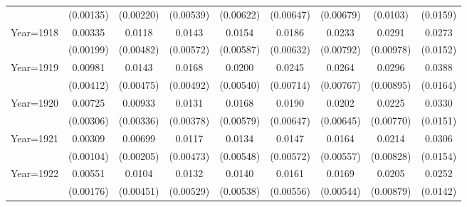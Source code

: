 \begin{table}[htbp]
\begin{tabular}{l*{8}{c}}
                    &   (0.00135)         &   (0.00220)         &   (0.00539)         &   (0.00622)         &   (0.00647)         &   (0.00679)         &    (0.0103)         &    (0.0159)         \\
[1em]
Year=1918           &     0.00335\sym{*}  &      0.0118\sym{**} &      0.0143\sym{**} &      0.0154\sym{***}&      0.0186\sym{***}&      0.0233\sym{***}&      0.0291\sym{***}&      0.0273\sym{*}  \\
                    &   (0.00199)         &   (0.00482)         &   (0.00572)         &   (0.00587)         &   (0.00632)         &   (0.00792)         &   (0.00978)         &    (0.0152)         \\
[1em]
Year=1919           &     0.00981\sym{**} &      0.0143\sym{***}&      0.0168\sym{***}&      0.0200\sym{***}&      0.0245\sym{***}&      0.0264\sym{***}&      0.0296\sym{***}&      0.0388\sym{**} \\
                    &   (0.00412)         &   (0.00475)         &   (0.00492)         &   (0.00540)         &   (0.00714)         &   (0.00767)         &   (0.00895)         &    (0.0164)         \\
[1em]
Year=1920           &     0.00725\sym{**} &     0.00933\sym{***}&      0.0131\sym{***}&      0.0168\sym{***}&      0.0190\sym{***}&      0.0202\sym{***}&      0.0225\sym{***}&      0.0330\sym{**} \\
                    &   (0.00306)         &   (0.00336)         &   (0.00378)         &   (0.00579)         &   (0.00647)         &   (0.00645)         &   (0.00770)         &    (0.0151)         \\
[1em]
Year=1921           &     0.00309\sym{***}&     0.00699\sym{***}&      0.0117\sym{**} &      0.0134\sym{**} &      0.0147\sym{**} &      0.0164\sym{***}&      0.0214\sym{**} &      0.0306\sym{**} \\
                    &   (0.00104)         &   (0.00205)         &   (0.00473)         &   (0.00548)         &   (0.00572)         &   (0.00557)         &   (0.00828)         &    (0.0154)         \\
[1em]
Year=1922           &     0.00551\sym{***}&      0.0104\sym{**} &      0.0132\sym{**} &      0.0140\sym{**} &      0.0161\sym{***}&      0.0169\sym{***}&      0.0205\sym{**} &      0.0252\sym{*}  \\
                    &   (0.00176)         &   (0.00451)         &   (0.00529)         &   (0.00538)         &   (0.00556)         &   (0.00544)         &   (0.00879)         &    (0.0142)         \\

\end{tabular}
\end{table}
